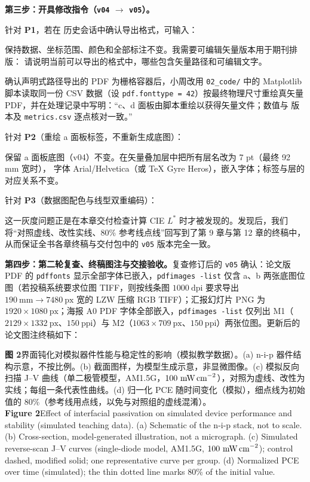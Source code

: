 \textbf{第三步：开具修改指令（\texttt{v04} $\rightarrow$ \texttt{v05}）。}

针对 \textbf{P1}，若在  历史会话中确认导出格式，可输入：
\begin{Prompt}
保持数据、坐标范围、颜色和全部标注不变。我需要可编辑矢量版本用于期刊排版：
请说明当前可以导出的格式中，哪些包含矢量路径和可编辑文字。
\end{Prompt}
确认声明式路径导出的 PDF 为栅格容器后，小周改用 \texttt{02\_code/} 中的 Matplotlib 脚本读取同一份 CSV 数据（设 \texttt{pdf.fonttype = 42}）按最终物理尺寸重绘真矢量 PDF，并在处理记录中写明：“c、d 面板由脚本重绘以获得矢量文件；数值与  版本及 \texttt{metrics.csv} 逐点核对一致。”

针对 \textbf{P2}（重绘 a 面板标签，不重新生成底图）：
\begin{Prompt}
保留 a 面板底图（v04）不变。在矢量叠加层中把所有层名改为 7 pt（最终 92 mm 宽时），
字体 Arial/Helvetica（或 TeX Gyre Heros），嵌入字体；标签与层的对应关系不变。
\end{Prompt}

针对 \textbf{P3}（数据图配色与线型双重编码）：
这一灰度问题正是在本章交付检查计算 CIE $L^*$ 时才被发现的。发现后，我们将“对照虚线、改性实线、80\% 参考线点线”回写到了第 9 章与第 12 章的终稿中，从而保证全书各章终稿与交付包中的 \texttt{v05} 版本完全一致。

\textbf{第四步：第二轮复查、终稿图注与交接验收。}复查修订后的 \texttt{v05} 确认：论文版 PDF 的 \texttt{pdffonts} 显示全部字体已嵌入，\texttt{pdfimages -list} 仅含 a、b 两张底图位图（若投稿系统要求位图 TIFF，则按线条图 $1000\ \text{dpi}$ 要求导出 $190\ \text{mm} \rightarrow 7480\ \text{px}$ 宽的 LZW 压缩 RGB TIFF）；汇报幻灯片 PNG 为 $1920 \times 1080\ \text{px}$；海报 A0 PDF 字体全部嵌入，\texttt{pdfimages -list} 仅列出 M1（$2129 \times 1332\ \text{px}$、$150\ \text{ppi}$）与 M2（$1063 \times 709\ \text{px}$、$150\ \text{ppi}$）两张位图。更新后的论文图注终稿如下：

\begin{BookNote}
\textbf{图 2}\quad 界面钝化对模拟器件性能与稳定性的影响（模拟教学数据）。(a) n-i-p 器件结构示意，不按比例。(b) 截面图样，为模型生成示意，非显微图像。(c) 模拟反向扫描 J–V 曲线（单二极管模型，AM1.5G，$100\ \text{mW\,cm}^{-2}$），对照为虚线、改性为实线；每组一条代表性曲线。(d) 归一化 PCE 随时间变化（模拟），细点线为初始值的 80\%（参考线用点线，以免与对照组的虚线混淆）。\\[3pt]
\textbf{Figure 2}\quad Effect of interfacial passivation on simulated device performance and stability (simulated teaching data). (a) Schematic of the n-i-p stack, not to scale. (b) Cross-section, model-generated illustration, not a micrograph. (c) Simulated reverse-scan J–V curves (single-diode model, AM1.5G, $100\ \text{mW\,cm}^{-2}$); control dashed, modified solid; one representative curve per group. (d) Normalized PCE over time (simulated); the thin dotted line marks 80\% of the initial value.
\end{BookNote}


